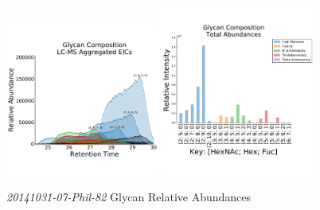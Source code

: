     \begin{figure}[!htbp]
        \centering
        \includegraphics[width=0.45\textwidth,valign=t]{figure/phil_82_chromatograms.pdf}
        \includegraphics[width=0.45\textwidth,valign=t]{figure/phil_82_abundances.pdf}
        \caption{\textit{20141031-07-Phil-82} Glycan Relative Abundances}
        \label{fig:phil_82_aggregated_eics}
    \end{figure}

